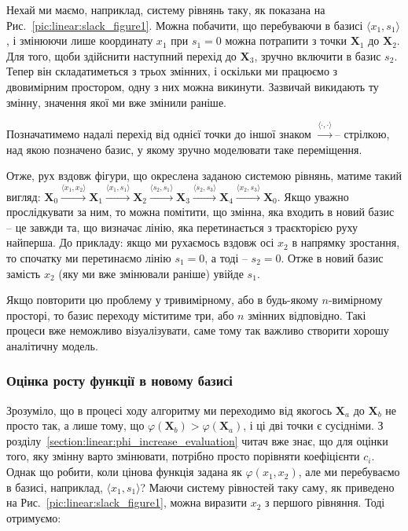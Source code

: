 \documentclass[\main/book.tex]{subfiles}
\begin{document}
Нехай ми маємо, наприклад, систему рівнянь таку, як показана на Рис.~\ref{pic:linear:slack_figure1}. Можна побачити, що перебуваючи в базисі ${\langle x_1, s_1 \rangle}$, і змінюючи лише координату $x_1$ при $s_1 = 0$ можна потрапити з точки $\mathbf{X}_1$ до $\mathbf{X}_2$. Для того, щоби здійснити наступний перехід до $\mathbf{X}_3$, зручно включити в базис $s_2$. Тепер він складатиметься з трьох змінних, і оскільки ми працюємо з двовимірним простором, одну з них можна \flqq{}викинути\frqq{}. Зазвичай \flqq{}викидають\frqq{} ту змінну, значення якої ми вже змінили раніше.

\begin{note}
 Позначатимемо надалі перехід від однієї точки до іншої знаком \flqq{}$\overset{\langle \cdot, \cdot \rangle}{\rightarrow}$\frqq -- стрілкою, над якою позначено базис, у якому зручно моделювати таке переміщення.
\end{note}

Отже, рух вздовж фігури, що окреслена заданою системою рівнянь, матиме такий вигляд:
$
\mathbf{X}_0
\overset{\langle x_1, x_2 \rangle}{\rightarrow}
\mathbf{X}_1
\overset{\langle x_1, s_1 \rangle}{\rightarrow}
\mathbf{X}_2
\overset{\langle s_2, s_1 \rangle}{\rightarrow}
\mathbf{X}_3
\overset{\langle s_2, s_3 \rangle}{\rightarrow}
\mathbf{X}_4
\overset{\langle x_2, s_3 \rangle}{\rightarrow}
\mathbf{X}_0
$. Якщо уважно прослідкувати за ним, то можна помітити, що змінна, яка входить в новий базис -- це завжди та, що визначає лінію, яка перетинається з траєкторією руху найперша. До прикладу: якщо ми рухаємось вздовж осі $x_2$ в напрямку зростання, то спочатку ми перетинаємо лінію $s_1 = 0$, а тоді -- $s_2 = 0$. Отже в новий базис замість $x_2$ (яку ми вже змінювали раніше) увійде $s_1$.

Якщо повторити цю проблему у тривимірному, або в будь-якому $n$-вимірному просторі, то базис переходу міститиме три, або $n$ змінних відповідно. Такі процеси вже неможливо візуалізувати, саме тому так важливо створити хорошу аналітичну модель.

\subsubsection{Оцінка росту функції в новому базисі}

Зрозуміло, що в процесі ходу алгоритму ми переходимо від якогось $\mathbf{X}_a$ до $\mathbf{X}_b$ не просто так, а лише тому, що $\varphi(\mathbf{X}_b) > \varphi(\mathbf{X}_a)$, і ці дві точки є сусідніми. З розділу~\ref{section:linear:phi_increase_evaluation} читач вже знає, що для оцінки того, яку змінну варто змінювати, потрібно просто порівняти коефіцієнти $c_i$. Однак що робити, коли цінова функція задана як $\varphi(x_1, x_2)$, але ми перебуваємо в базисі, наприклад, $\langle x_1, s_1 \rangle$? Маючи систему рівностей таку саму, як приведено на Рис.~\ref{pic:linear:slack_figure1}, можна виразити $x_2$ з першого рівняння. Тоді отримуємо:
\end{document}
